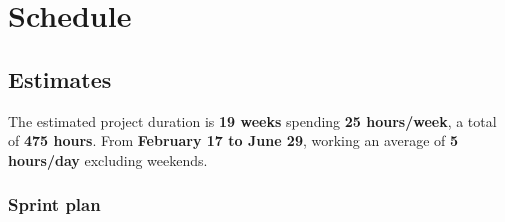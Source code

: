 \section{Schedule}
\label{chap:schedule}

\subsection{Estimates}
The estimated project duration is \textbf{19 weeks} spending \textbf{25 hours/week}, a total of \textbf{475 hours}.
From \textbf{February 17 to June 29}, working an average of \textbf{5 hours/day} excluding weekends.






\subsubsection{Sprint plan}

